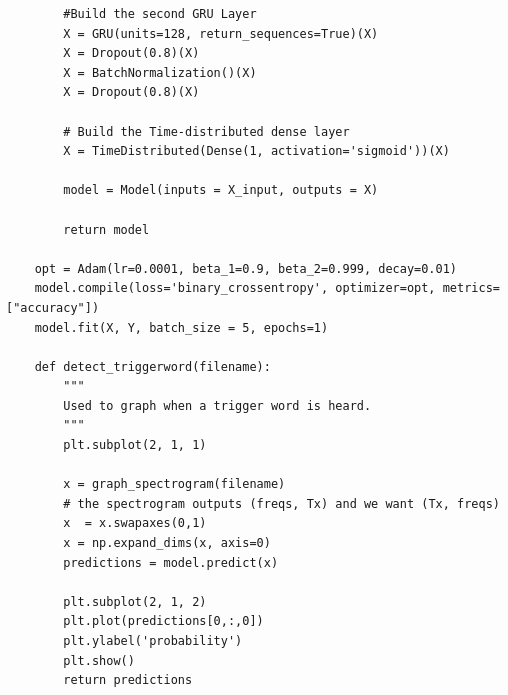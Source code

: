 \documentclass[11pt, a4paper]{article}
\begin{document}
\begin{spacing}{1.1}
\begin{lstlisting}
		#Build the second GRU Layer
		X = GRU(units=128, return_sequences=True)(X)
		X = Dropout(0.8)(X)
		X = BatchNormalization()(X)
		X = Dropout(0.8)(X)
		
		# Build the Time-distributed dense layer
		X = TimeDistributed(Dense(1, activation='sigmoid'))(X)
		
		model = Model(inputs = X_input, outputs = X)
		
		return model
	
	opt = Adam(lr=0.0001, beta_1=0.9, beta_2=0.999, decay=0.01)
	model.compile(loss='binary_crossentropy', optimizer=opt, metrics=["accuracy"])
	model.fit(X, Y, batch_size = 5, epochs=1) 
	
	def detect_triggerword(filename):
		"""
		Used to graph when a trigger word is heard.
		"""
		plt.subplot(2, 1, 1)
		
		x = graph_spectrogram(filename)
		# the spectrogram outputs (freqs, Tx) and we want (Tx, freqs)
		x  = x.swapaxes(0,1)
		x = np.expand_dims(x, axis=0)
		predictions = model.predict(x)
		
		plt.subplot(2, 1, 2)
		plt.plot(predictions[0,:,0])
		plt.ylabel('probability')
		plt.show()
		return predictions \end{lstlisting} 
	
	








	
	
	
	
\end{spacing}
\end{document}

